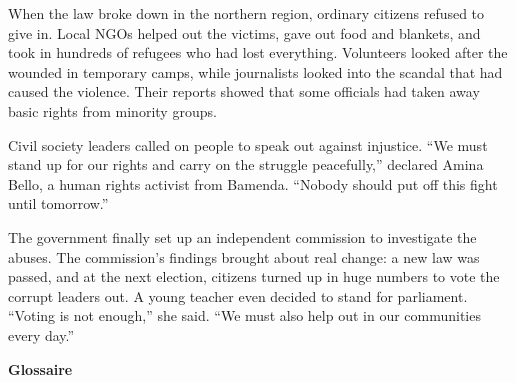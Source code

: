 \documentclass[11pt]{article}
\begin{document}
\begin{textebox}
When the law broke down in the northern region, ordinary citizens refused to give in. Local NGOs helped out the victims, gave out food and blankets, and took in hundreds of refugees who had lost everything. Volunteers looked after the wounded in temporary camps, while journalists looked into the scandal that had caused the violence. Their reports showed that some officials had taken away basic rights from minority groups.

Civil society leaders called on people to speak out against injustice. “We must stand up for our rights and carry on the struggle peacefully,” declared Amina Bello, a human rights activist from Bamenda. “Nobody should put off this fight until tomorrow.”

The government finally set up an independent commission to investigate the abuses. The commission's findings brought about real change: a new law was passed, and at the next election, citizens turned up in huge numbers to vote the corrupt leaders out. A young teacher even decided to stand for parliament. “Voting is not enough,” she said. “We must also help out in our communities every day.”
\end{textebox}

\textbf{Glossaire}
\end{document}
